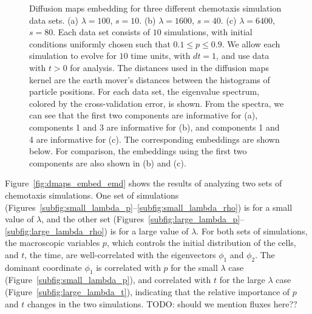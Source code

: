 \documentclass[preprint]{elsarticle}
\begin{document}
\begin{figure}
\begin{subfigure}[t]{0.35\textwidth}
\caption{}
\end{subfigure}
%
\caption{Diffusion maps embedding for three different chemotaxis simulation data sets. (a) $\lambda = 100$, $s = 10$. (b) $\lambda = 1600$, $s = 40$. (c) $\lambda = 6400$, $s = 80$. Each data set consists of $10$ simulations, with initial conditions uniformly chosen such that $0.1 \le p  \le 0.9$. We allow each simulation to evolve for $10$ time units, with $dt=1$, and use data with $t > 0$ for analysis. The distances used in the diffusion maps kernel are the earth mover's distances between the histograms of particle positions. For each data set, the eigenvalue spectrum, colored by the cross-validation error, is shown. From the spectra, we can see that the first two components are informative for (a), components 1 and 3 are informative for (b), and components 1 and 4 are informative for (c). The corresponding embeddings are shown below. For comparison, the embeddings using the first two components are also shown in (b) and (c).}
%
\label{fig:chemotaxis_simulations_harmonics}
\end{figure}


Figure~\ref{fig:dmaps_embed_emd} shows the results of analyzing two sets of chemotaxis simulations. 
%
One set of simulations (Figures~\ref{subfig:small_lambda_p}--\ref{subfig:small_lambda_rho}) is for a small value of $\lambda$, and the other set (Figures~\ref{subfig:large_lambda_p}--\ref{subfig:large_lambda_rho}) is for a large value of $\lambda$. 
%
For both sets of simulations, the macroscopic variables $p$, which controls the initial distribution of the cells, and $t$, the time, are well-correlated with the eigenvectors $\phi_1$ and $\phi_2$. 
%
%
The dominant coordinate $\phi_1$ is correlated with $p$ for the small $\lambda$ case (Figure~\ref{subfig:small_lambda_p}), and correlated with $t$ for the large $\lambda$ case (Figure~\ref{subfig:large_lambda_t}), indicating that the relative importance of $p$ and $t$ changes in the two simulations.
%
TODO: should we mention fluxes here??
\end{document}
